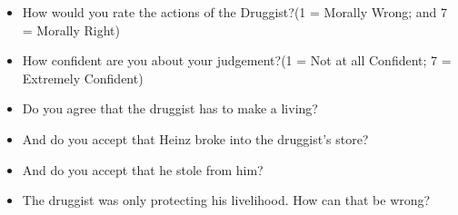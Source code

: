 \documentclass[
  american,
  man,floatsintext]{apa7}
\providecommand{\tightlist}{%
  \setlength{\itemsep}{0pt}\setlength{\parskip}{0pt}}
\begin{document}
\begin{itemize}
\tightlist
\item
  How would you rate the actions of the Druggist?(1 = Morally Wrong; and 7 = Morally Right)
\item
  How confident are you about your judgement?(1 = Not at all Confident; 7 = Extremely Confident)
\item
  Do you agree that the druggist has to make a living?
\item
  And do you accept that Heinz broke into the druggist's store?
\item
  And do you accept that he stole from him?
\item
  The druggist was only protecting his livelihood. How can that be wrong?
\end{itemize}


\clearpage
\renewcommand{\listfigurename}{Figure captions}

\clearpage
\renewcommand{\listtablename}{Table captions}
\end{document}
